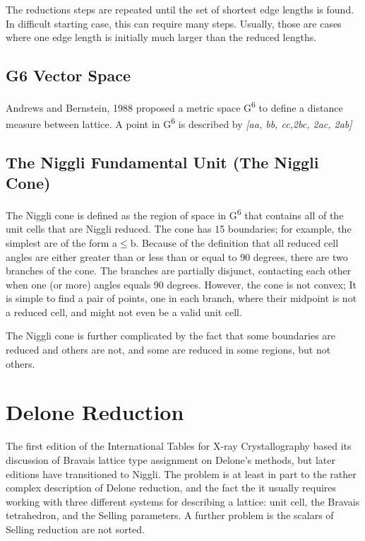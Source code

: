 \documentclass[11pt]{article} %
\begin{document}
The reductions steps are repeated until the set of shortest edge lengths is found. In difficult starting case, this can require many steps. Usually, those are cases where one edge length is initially much larger than the reduced lengths.

\subsection{G6 Vector Space}

Andrews and Bernstein, 1988\cite{Andrews1988} proposed a metric space G\textsuperscript{6} to define a distance measure between lattice. A point in G\textsuperscript{6} is described by \textit{[a{\textbullet}a, b{\textbullet}b, c{\textbullet}c,2b{\textbullet}c, 2a{\textbullet}c, 2a{\textbullet}b]} 

\subsection{The Niggli Fundamental Unit (The Niggli Cone)}
	
The Niggli cone is defined as the region of space in G\textsuperscript{6} that contains all of the unit cells that are Niggli reduced. The cone has 15 boundaries; for example, the simplest are of the form a$\leq$b. Because of the definition that all reduced cell angles are either greater than or less than or equal to 90 degrees, there are two branches of the cone. The branches are partially disjunct, contacting each other when one (or more) angles equals 90 degrees. However, the cone is not convex; It is simple to find a pair of points, one in each branch, where their midpoint is not a reduced cell, and might not even be a valid unit cell.

The Niggli cone is further complicated by the fact that some boundaries are reduced and others are not, and some are reduced in some regions, but not others.

\section{Delone Reduction}

The first edition of the International Tables for X-ray Crystallography based its discussion of Bravais lattice type assignment on Delone's methods, but later editions have transitioned to Niggli. The problem is at least in part to the rather complex description of Delone reduction, and the fact the it usually requires working with three different systems for describing a lattice: unit cell, the Bravais tetrahedron, and the Selling parameters. A further problem is the scalars of Selling reduction are not sorted.
\end{document}
